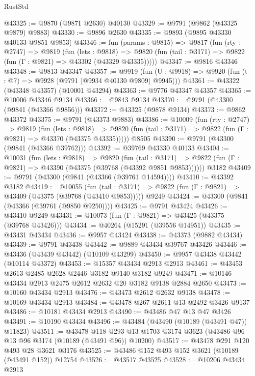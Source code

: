\begin{lexlean}{RustStd}
\begin{coremodule}
@43325 := @9870 (@9871 @2630) @40130
@43329 := @9791 (@9862 (@43325 @9879) @9883)
@43330 := @9896 @2630
@43335 := @9893 (@9895 @43330 @40133 @9851 @9853)
@43346 := fun (params : @9815) =>
  @9817
    (fun (rty : @2747) =>
    @9819
      (fun (lets : @9818) =>
      @9820 (fun (tail : @3171) => @9822 (fun (Γ : @9821) => @43302 (@43329 @43335)))))
@43347 := @9816 @43346
@43348 := @9813 @43347
@43357 := @9919
    (fun (U : @9918) => @9920 (fun (t : @7) => @9928 (@9791 (@9934 @40130 @9809) @9945)))
@43361 := @43322 (@43348 @43357) (@10001 @43294)
@43363 := @9776 @43347 @43357
@43365 := @10006 @43346 @9134
@43366 := @9843 @9134
@43370 := @9791 (@43300 (@9841 (@43366 @9856)))
@43372 := @43325 (@9878 @9134)
@43373 := @9862 @43372
@43375 := @9791 (@43373 @9883)
@43386 := @10009
    (fun (rty : @2747) =>
    @9819
      (fun (lets : @9818) =>
      @9820 (fun (tail : @3171) => @9822 (fun (Γ : @9821) => @43370 (@43375 @43335)))))
    @8505
@43390 := @9791 (@43300 (@9841 (@43366 @39762)))
@43392 := @39769 @43330 @40133
@43404 := @10031
    (fun (lets : @9818) =>
    @9820
      (fun (tail : @3171) =>
      @9822 (fun (Γ : @9821) => @43390 (@43375 (@39768 (@43392 @9851 @9853))))))
    @3182
@43409 := @9791 (@43300 (@9841 (@43366 (@39761 @14594))))
@43410 := @43392 @3182
@43419 := @10055
    (fun (tail : @3171) => @9822 (fun (Γ : @9821) => @43409 (@43375 (@39768 (@43410 @9853)))))
    @9249
@43424 := @43300 (@9841 (@43366 (@39761 (@9850 @9250))))
@43425 := @9791 @43424
@43426 := @43410 @9249
@43431 := @10073 (fun (Γ : @9821) => @43425 (@43375 (@39768 @43426)))
@43434 := @40264 (@15291 (@39556 @14951))
@43435 := @43431 @43434
@43436 := @9957 @43424
@43438 := @43373 (@9882 @43434)
@43439 := @9791 @43438
@43442 := @9889 @43434 @39767 @43426
@43446 := @43436 (@43439 @43442) (@10109 @43299)
@43450 := @9957 @43438 @43442 (@10114 @43372)
@43453 := @15357 @43434 @2913 @2913
@43461 := @43453 @2613 @2485 @2628 @2446 @3182 @9140 @3182 @9249
@43471 := @10146 @43434 @2913 @2475 @2612 @2632 @20 @3182 @9138 @2884 @2650
@43473 := @10160 @43434 @2913
@43476 := @43473 @2612 @2632 @9138
@43478 := @10169 @43434 @2913
@43484 := @43478 @267 @2611 @13 @2492 @3426 @9137
@43486 := @10181 @43434 @2913
@43490 := @43486 @47 @13 @47 @3426
@43491 := @10190 @43434
@43496 := @43484 (@43490 (@10189 (@43491 @47)) @11823)
@43511 := @43478
    @118
    @293
    @13
    @1703
    @3174
    @3623
    (@43486 @96 @13 @96 @3174 (@10189 (@43491 @96)) @10200)
@43517 := @43478 @291 @120 @493 @28 @3621 @3176
@43525 := @43486 @152 @493 @152 @3621 (@10189 (@43491 @152)) @12754
@43526 := @43517 @43525
@43528 := @10206 @43434 @2913

\end{coremodule}
\end{lexlean}
